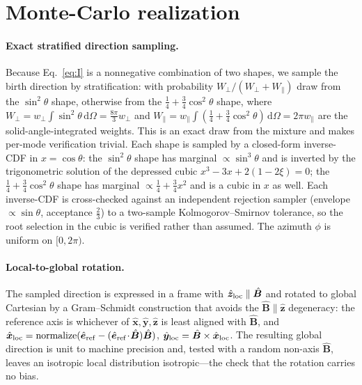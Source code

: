 \documentclass[11pt]{article}
\newcommand{\Bhat}{\hat{\bm{B}}}
\newcommand{\dd}{\,\mathrm{d}}
\begin{document}
\section{Monte-Carlo realization}
\label{sec:mc}

\paragraph{Exact stratified direction sampling.}
Because Eq.~\eqref{eq:I} is a nonnegative combination of two shapes, we sample the birth
direction by stratification: with probability $W_\perp/(W_\perp+W_\parallel)$ draw from
the $\sin^2\theta$ shape, otherwise from the $\tfrac14+\tfrac34\cos^2\theta$ shape, where
$W_\perp=w_\perp\!\int\!\sin^2\theta\dd\Omega=\tfrac{8\pi}{3}w_\perp$ and
$W_\parallel=w_\parallel\!\int(\tfrac14+\tfrac34\cos^2\theta)\dd\Omega=2\pi w_\parallel$
are the solid-angle-integrated weights. This is an exact draw from the mixture and makes
per-mode verification trivial. Each shape is sampled by a closed-form inverse-CDF in
$x=\cos\theta$: the $\sin^2\theta$ shape has marginal $\propto\sin^3\theta$ and is inverted
by the trigonometric solution of the depressed cubic $x^3-3x+2(1-2\xi)=0$; the
$\tfrac14+\tfrac34\cos^2\theta$ shape has marginal $\propto\tfrac14+\tfrac34x^2$ and is a
cubic in $x$ as well. Each inverse-CDF is cross-checked against an independent rejection
sampler (envelope $\propto\sin\theta$, acceptance $\tfrac23$) to a two-sample
Kolmogorov--Smirnov tolerance, so the root selection in the cubic is verified rather than
assumed. The azimuth $\phi$ is uniform on $[0,2\pi)$.

\paragraph{Local-to-global rotation.}
The sampled direction is expressed in a frame with $\hat{\bm z}_{\rm loc}\parallel\Bhat$
and rotated to global Cartesian by a Gram--Schmidt construction that avoids the
$\Bhat\parallel\hat{\bm z}$ degeneracy: the reference axis is whichever of
$\hat{\bm x},\hat{\bm y},\hat{\bm z}$ is least aligned with $\Bhat$, and
$\hat{\bm x}_{\rm loc}=\mathrm{normalize}(\hat{\bm e}_{\rm ref}-(\hat{\bm e}_{\rm ref}\!\cdot\!\Bhat)\Bhat)$,
$\hat{\bm y}_{\rm loc}=\Bhat\times\hat{\bm x}_{\rm loc}$. The resulting global direction is
unit to machine precision and, tested with a random non-axis $\Bhat$, leaves an isotropic
local distribution isotropic---the check that the rotation carries no bias.
\end{document}
